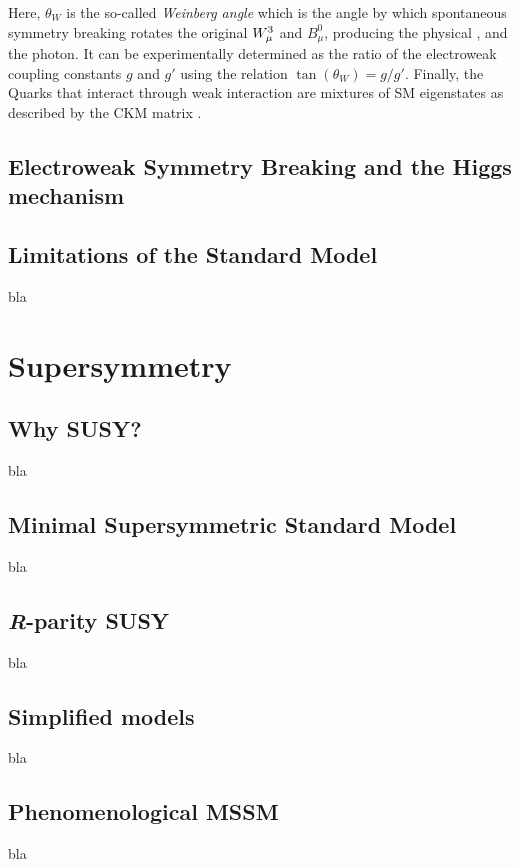 				Here, $\theta_W$ is the so-called \emph{Weinberg angle} which is the angle by which spontaneous symmetry breaking rotates the original $W_{\mu}^3$ and $B_{\mu}^0$, producing the physical \Zboson, and the photon. It can be experimentally determined as the ratio of the electroweak coupling constants $g$ and $g'$ using the relation $\tan(\theta_W) = g / g'$. Finally, the Quarks that interact through weak interaction are mixtures of SM eigenstates as described by the CKM matrix \cite{Olive2014}. 



			\subsection*{Electroweak Symmetry Breaking and the Higgs mechanism}




		\subsection{Limitations of the Standard Model}
		\label{sec:SMlim}
		
			bla





	\section{Supersymmetry}
	\label{sec:SUSY}

		\subsection{Why SUSY?}
			
			bla

		\subsection{Minimal Supersymmetric Standard Model}
			
			bla

		\subsection{\emph{R}-parity SUSY}
		
			bla

		\subsection{Simplified models}
		
			bla


		\subsection{Phenomenological MSSM}
		
			bla

